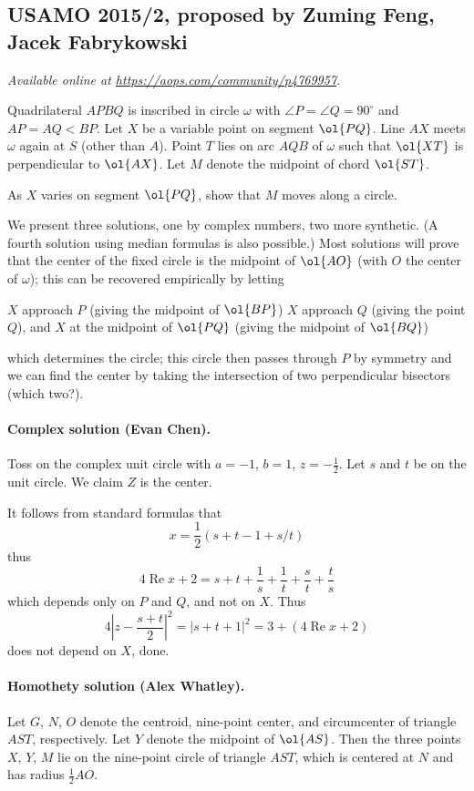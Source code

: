 \documentclass[11pt]{scrartcl}
\begin{document}
\subsection{USAMO 2015/2, proposed by Zuming Feng, Jacek Fabrykowski}
\textsl{Available online at \url{https://aops.com/community/p4769957}.}
\begin{mdframed}[style=mdpurplebox,frametitle={Problem statement}]
Quadrilateral $APBQ$ is inscribed in circle $\omega$ with
$\angle P = \angle Q = 90^{\circ}$ and $AP = AQ < BP$.
Let $X$ be a variable point on segment $\ol{PQ}$.
Line $AX$ meets $\omega$ again at $S$ (other than $A$).
Point $T$ lies on arc $AQB$ of $\omega$ such that $\ol{XT}$
is perpendicular to $\ol{AX}$.
Let $M$ denote the midpoint of chord $\ol{ST}$.

As $X$ varies on segment $\ol{PQ}$, show that $M$ moves along a circle.
\end{mdframed}
We present three solutions,
one by complex numbers, two more synthetic.
(A fourth solution using median formulas is also possible.)
Most solutions will prove that the center of the fixed circle
is the midpoint of $\ol{AO}$
(with $O$ the center of $\omega$);
this can be recovered empirically by letting
\begin{itemize}
  \ii $X$ approach $P$ (giving the midpoint of $\ol{BP}$)
  \ii $X$ approach $Q$ (giving the point $Q$), and
  \ii $X$ at the midpoint of $\ol{PQ}$ (giving the midpoint of $\ol{BQ}$)
\end{itemize}
which determines the circle;
this circle then passes through $P$ by symmetry
and we can find the center by taking the intersection
of two perpendicular bisectors (which two?).

\paragraph{Complex solution (Evan Chen).}
Toss on the complex unit circle with $a = -1$, $b=1$, $z = -\tfrac12$.
Let $s$ and $t$ be on the unit circle. We claim $Z$ is the center.

It follows from standard formulas that
\[ x = \frac 12 \left( s + t - 1 + s/t \right) \]
thus \[ 4\operatorname{Re} x + 2
  = s + t + \frac 1s + \frac 1t + \frac st + \frac ts \]
which depends only on $P$ and $Q$, and not on $X$.
Thus \[ 4\left\lvert z-\frac{s+t}{2} \right\rvert^2
  = \left\lvert s+t+1 \right\rvert^2 = 3 + (4\operatorname{Re}x+2) \]
does not depend on $X$, done.

\paragraph{Homothety solution (Alex Whatley).}
Let $G$, $N$, $O$ denote the centroid, nine-point center,
and circumcenter of triangle $AST$, respectively.
Let $Y$ denote the midpoint of $\ol{AS}$.
Then the three points $X$, $Y$, $M$
lie on the nine-point circle of triangle $AST$,
which is centered at $N$ and has radius $\frac 12 AO$.
\end{document}
